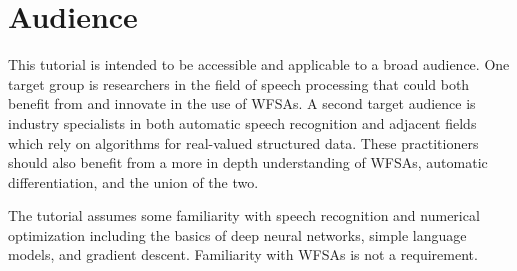 \documentclass[11pt]{article}
\begin{document}
\section*{Audience}

This tutorial is intended to be accessible and applicable to a broad audience.
One target group is researchers in the field of speech processing that could
both benefit from and innovate in the use of WFSAs. A second target audience is
industry specialists in both automatic speech recognition and adjacent fields
which rely on algorithms for real-valued structured data. These practitioners
should also benefit from a more in depth understanding of WFSAs, automatic
differentiation, and the union of the two.

The tutorial assumes some familiarity with speech recognition and numerical
optimization including the basics of deep neural networks, simple language
models, and gradient descent. Familiarity with WFSAs is not a requirement.



\end{document}
